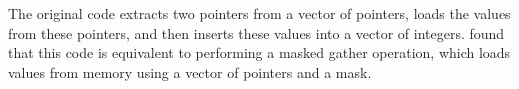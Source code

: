 The original code extracts two pointers from a vector of pointers,
loads the values from these pointers, and then inserts these values
into a vector of integers. \minotaur{} found that this code is equivalent
to performing a masked gather operation, which loads values from
memory using a vector of pointers and a mask.